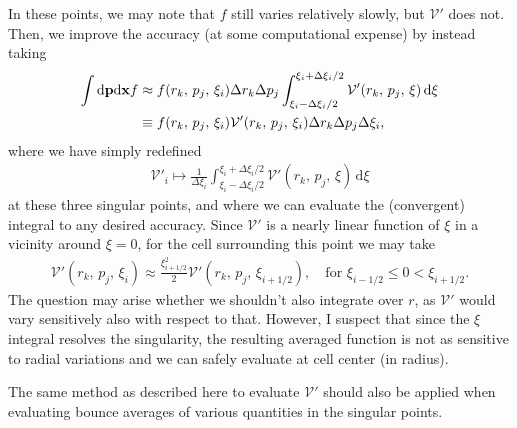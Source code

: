 \documentclass[11pt,a4paper]{article}
\newcommand{\rd}{\ensuremath{\mathrm{d}}}
\newcommand{\Vp}{\ensuremath{\mathcal{V}'} }
\renewcommand{\b}[1]{\ensuremath{ {\bf #1 } }}
\begin{document}
In these points, we may note that $f$ still varies relatively slowly, but \Vp{} does not. Then, we improve the accuracy (at some computational expense) by instead taking
\begin{align}
\int \rd \b{p} \rd \b{x}  f &\approx f(r_k,\, p_j ,\,\xi_i) \Delta r_k \Delta p_j \int_{\xi_i-\Delta \xi_i/2}^{\xi_i+\Delta \xi_i/2} \Vp(r_k,\,p_j,\,\xi) \,\rd\xi \nonumber \\
&\equiv f(r_k,\,p_j,\,\xi_i) \mathcal{V}'(r_k,\,p_j,\,\xi_i) \Delta r_k \Delta p_j \Delta \xi_i,
\end{align}
where we have simply redefined
\begin{align}
\Vp_i \mapsto \frac{1}{\Delta \xi_i}\int_{\xi_i-\Delta \xi_i/2}^{\xi_i+\Delta \xi_i/2} \Vp(r_k,\,p_j,\,\xi) \,\rd\xi 
\end{align}
at these three singular points, and where we can evaluate the (convergent) integral to any desired accuracy. Since \Vp{} is a nearly linear function of $\xi$ in a vicinity around $\xi=0$, for the cell surrounding this point we may take
\begin{align}
\Vp(r_k,\,p_j,\,\xi_i) \approx \frac{\xi_{i+1/2}^2}{2} \Vp(r_k,\,p_j,\,\xi_{i+1/2}), \quad \text{for } \xi_{i-1/2} \leq 0 < \xi_{i+1/2}.
\end{align}
The question may arise whether we shouldn't also integrate over $r$, as \Vp would vary sensitively also with respect to that. However, I suspect that since the $\xi$ integral resolves the singularity, the resulting averaged function is not as sensitive to radial variations and we can safely evaluate at cell center (in radius).

The same method as described here to evaluate \Vp should also be applied when evaluating bounce averages of various quantities in the singular points.
\end{document}
